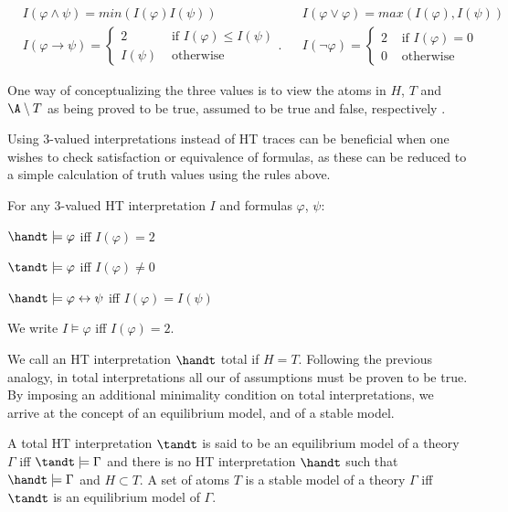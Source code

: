 \begin{align*}
&I(\varphi \wedge \psi) = min(I(\varphi) I(\psi)) 
&&I(\varphi \vee \varphi) = max(I(\varphi),I(\psi)) \\
&I(\varphi \rightarrow \psi) = 
\begin{cases}
  2 & \text { if } I(\varphi) \leq I(\psi) \\
  I(\psi) & \text { otherwise }
\end{cases}.
&&I(\neg \varphi) = \begin{cases}2 
  & \text { if } I(\varphi)=0 \\ 
  0 & \text { otherwise }\end{cases} 
\end{align*}

One way of conceptualizing the three values is to view the atoms in $H$,
$T$ and $\A \setminus T$ as being proved to be true,
assumed to be true and false, respectively
\cite{agcadipescscvi20a}.

Using 3-valued interpretations instead of HT traces can be beneficial
when one wishes to check satisfaction or equivalence of formulas, as
these can be reduced to a simple calculation of truth values using the
rules above.

\begin{proposition}\label{prop:3-valued-ht}
For any 3-valued HT interpretation $I$ and formulas $\varphi$, $\psi$:
\begin{description}
  \item $\handt \models \varphi$ iff $I(\varphi) = 2$
  \item $\tandt \models \varphi$ iff $I(\varphi) \neq 0$
  \item $\handt \models \varphi \leftrightarrow \psi$ iff $I(\varphi) = I(\psi)$
\end{description}
\end{proposition}

We write $I \models \varphi$ iff $I(\varphi)=2$.

We call an HT interpretation $\handt$ total if $H=T$. Following the
previous analogy, in total interpretations all our of assumptions must
be proven to be true. By imposing an additional minimality condition
on total interpretations, we arrive at the concept of an equilibrium
model, and of a stable model.

\begin{definition}
  A total HT interpretation $\tandt$ is said to be an equilibrium
  model of a theory $\Gamma$ iff $\tandt \models \Gamma$ and there is
  no HT interpretation $\handt$ such that $\handt \models \Gamma$ and
  $H \subset T$. A set of atoms $T$ is a stable model of a theory
  $\Gamma$ iff $\tandt$ is an equilibrium model of $\Gamma$.
\end{definition}

